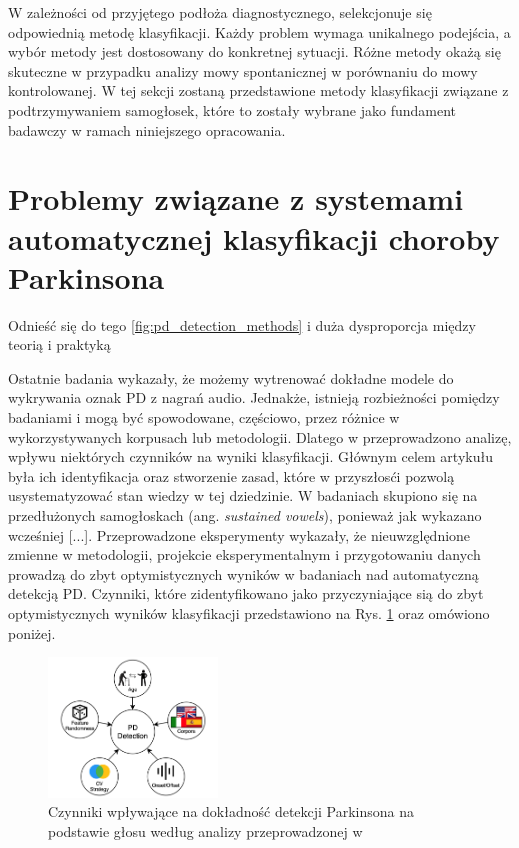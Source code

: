 W zależności od przyjętego podłoża diagnostycznego, selekcjonuje się odpowiednią metodę klasyfikacji.
Każdy problem wymaga unikalnego podejścia, a wybór metody jest dostosowany do konkretnej sytuacji.
Różne metody okażą się skuteczne w przypadku analizy mowy spontanicznej w porównaniu do mowy kontrolowanej.
W tej sekcji zostaną przedstawione metody klasyfikacji związane z podtrzymywaniem samogłosek, które to zostały wybrane jako
fundament badawczy w ramach niniejszego opracowania.


\section{Problemy związane z systemami automatycznej klasyfikacji choroby Parkinsona}\label{sec:problemy}

Odnieść się do tego \ref{fig:pd_detection_methods} i duża dysproporcja między teorią i praktyką

Ostatnie badania wykazały, że możemy wytrenować dokładne modele do wykrywania oznak PD z nagrań audio.
Jednakże, istnieją rozbieżności pomiędzy badaniami i mogą być spowodowane, częściowo, przez różnice w
wykorzystywanych korpusach lub metodologii.
Dlatego w  \cite{SustainedVowelsProblems} przeprowadzono analizę, wpływu niektórych czynników na wyniki klasyfikacji.
Głównym celem artykułu była ich identyfikacja oraz stworzenie zasad, które w przyszłosći pozwolą usystematyzować
stan wiedzy w tej dziedzinie.
W badaniach skupiono się na przedłużonych samogłoskach (ang. \emph{sustained vowels}), ponieważ jak wykazano wcześniej
[...].
Przeprowadzone eksperymenty wykazały, że nieuwzględnione zmienne w metodologii, projekcie eksperymentalnym i
przygotowaniu danych prowadzą do zbyt optymistycznych wyników w badaniach nad automatyczną detekcją PD.
Czynniki, które zidentyfikowano jako przyczyniające sią do zbyt optymistycznych wyników klasyfikacji
przedstawiono na Rys. \ref{fig:factors_PD_detection} oraz omówiono poniżej.


\begin{figure}[htbp]
	\centering
	\includegraphics[width=0.4\textwidth]{./img/influence_of_factors_on_PD_detection}
	\caption{Czynniki wpływające na dokładność detekcji Parkinsona na podstawie głosu według analizy przeprowadzonej w \cite{SustainedVowelsProblems}}
    \label{fig:factors_PD_detection}
\end{figure}


